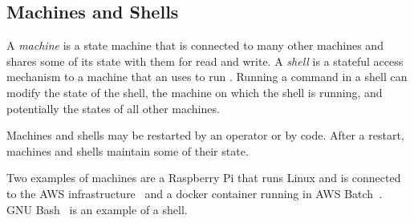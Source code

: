\subsection{Machines and Shells}\label{machine}

A \emph{machine} is a state machine that is connected to many other machines and shares some of its state with them for read and write. A \emph{shell} is a stateful access mechanism to a machine that an  uses to run . Running a command in a shell can modify the state of the shell, the machine on which the shell is running, and potentially the states of all other machines. 

Machines and shells may be restarted by an operator or by code. After a restart, machines and shells maintain some of their state. 

Two examples of machines are a Raspberry Pi that runs Linux and is connected to the AWS infrastructure~\cite{aws} and a docker container running in AWS Batch~\cite{awsbatch}. GNU Bash~\cite{gnu_bash} is an example of a shell.